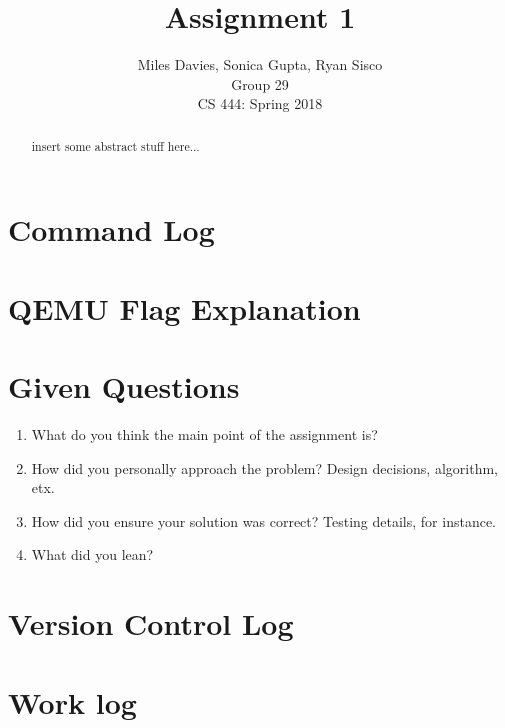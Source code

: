 \documentclass[10pt,draftclsnofoot]{article}
\title{Assignment 1}
\author{Miles Davies, Sonica Gupta, Ryan Sisco \\ Group 29 \\ CS 444: Spring 2018}
\begin{document}
\maketitle
\begin{abstract}
insert some abstract stuff here...
\end{abstract}

\newpage

\tableofcontents
\newpage 

\section{Command Log}

\section{QEMU Flag Explanation}

\section{Given Questions}
\begin{enumerate}
\item{What do you think the main point of the assignment is?}

\item{How did you personally approach the problem? Design decisions, algorithm, etx.}

\item{How did you ensure your solution was correct? Testing details, for instance.}

\item{What did you lean?} 

\end{enumerate}
\section{Version Control Log}

\section{Work log}
\end{document}
